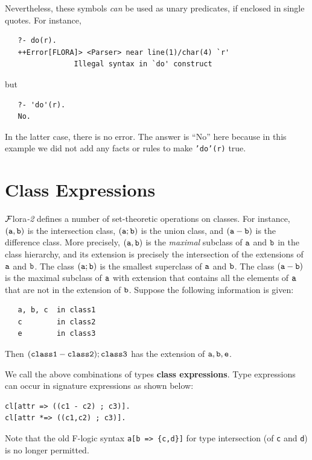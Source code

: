 \documentclass[11pt]{article}
\newcommand{\Mvd}{{\mbox{\tt \,=>\,}}}  %
\newcommand{\FLORA}{{\mbox{\sc ${\cal F}${lora}\rm\emph{-2}}}\xspace}
\newcommand{\fl}{\mbox{F-logic}\xspace}
\begin{document}
Nevertheless, these symbols \emph{can} be used as unary predicates, if enclosed
in single quotes. For instance, 
\begin{verbatim}
   ?- do(r).
   ++Error[FLORA]> <Parser> near line(1)/char(4) `r'
                Illegal syntax in `do' construct
\end{verbatim}
but
\begin{verbatim}
   ?- 'do'(r).
   No.
\end{verbatim}
In the latter case, there is no error. The answer is ``No'' here because in
this example we did not add any facts or rules to make \texttt{'do'(r)}
true. 


\section{Class Expressions}
\label{sec-class-expr}

\FLORA defines a number of set-theoretic
operations on classes. For instance, $\tt (a,b)$ is the
intersection class, $\tt (a;b)$ is the union class, and $\tt (a-b)$ is
the difference class. More precisely, $\tt (a,b)$ is the \emph{maximal}
subclass of $\tt a$ and $\tt b$ in the class hierarchy, and its extension is
precisely the intersection of the extensions of $\tt a$ and $\tt b$. The class
$\tt (a;b)$ is the smallest superclass of $\tt a$ and $\tt b$. The class $\tt (a-b)$ is the
maximal subclass of $\tt a$ with extension that contains all the elements of
$\tt a$ that are not in the extension of $\tt b$.
Suppose
the following information is given:
\begin{verbatim}
   a, b, c  in class1
   c        in class2
   e        in class3
\end{verbatim}
Then $\tt (class1 - class2) ; class3$ has the extension of $\tt a,b,e$.

We call the above combinations of types {\bf class expressions}.  
Type expressions can occur in signature expressions as shown below:
\begin{verbatim}
cl[attr => ((c1 - c2) ; c3)].
cl[attr *=> ((c1,c2) ; c3)].
\end{verbatim}
Note that the old \fl syntax {\tt a[b\Mvd \{c,d\}]} for type intersection
(of {\tt c} and {\tt d}) is no longer permitted.
\end{document}

